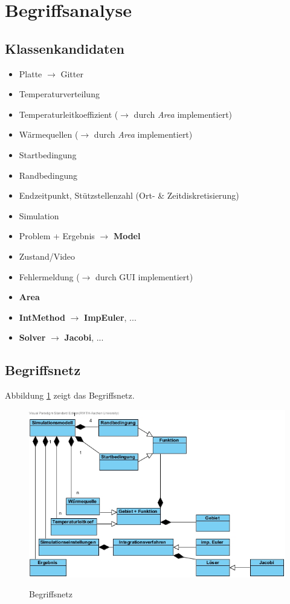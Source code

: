 \section{Begriffsanalyse}

\subsection{Klassenkandidaten}
\begin{itemize}
	\item Platte $\rightarrow$ Gitter
	\item Temperaturverteilung
	\item Temperaturleitkoeffizient ($\rightarrow$ durch \emph{Area} implementiert)
	\item Wärmequellen ($\rightarrow$ durch \emph{Area} implementiert)
	\item Startbedingung %
	\item Randbedingung %
	\item Endzeitpunkt, Stützstellenzahl (Ort- \& Zeitdiskretisierung)
	\item Simulation
	\item Problem + Ergebnis $\rightarrow$ \textbf{Model}
	\item Zustand/Video
	\item Fehlermeldung ($\rightarrow$ durch GUI implementiert)
	\item \textbf{Area}
	\item \textbf{IntMethod} $\rightarrow$ \textbf{ImpEuler}, ...
	\item \textbf{Solver} $\rightarrow$ \textbf{Jacobi}, ...
\end{itemize}

\subsection{Begriffsnetz}
Abbildung \ref{Begriffsnetz} zeigt das Begriffsnetz.
\begin{figure}[H]
	\centering
	\includegraphics[scale=.75]{Bilder/Begriffsnetz.jpg}\\
	\caption{Begriffsnetz}
	\label{Begriffsnetz}
\end{figure}